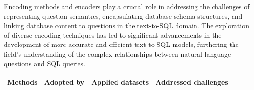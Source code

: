Encoding methods and encoders play a crucial role in addressing the challenges of representing question semantics, encapsulating database schema structures, and linking database content to questions in the text-to-SQL domain. The exploration of diverse encoding techniques has led to significant advancements in the development of more accurate and efficient text-to-SQL models, furthering the field's understanding of the complex relationships between natural language questions and SQL queries\cite{deng2022recent}.

\begin{table}
    \centering
    \begin{tabular}{|c|c|c|c|}
        \hline
        \rowcolor{Gray}
        \textbf{Methods}                & \textbf{Adopted by} & \textbf{Applied datasets} & \textbf{Addressed challenges}                                                                              \\
        \hline


\end{tabular}
\end{table}
